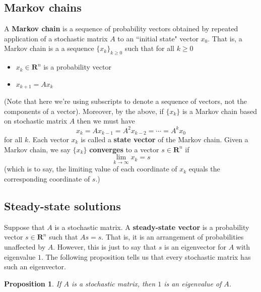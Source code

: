 \documentclass[12pt]{article}
\numberwithin{equation}{subsection}
\numberwithin{figure}{subsection}
\newtheorem{prop}[subsection]{Proposition}
\theoremstyle{note}
\newcommand{\R}{\mathbf{R}}
\begin{document}
\subsection{Markov chains} A \textbf{Markov chain} is a sequence of probability vectors obtained by repeated application of a stochastic matrix $A$ to an ``initial state" vector $x_0$. That is, a Markov chain is a a sequence $\{x_k\}_{k\geq 0}$  such that for all $k\geq 0$
\begin{itemize} \item $x_k\in \R^n$ is a probability vector
\item $  x_{k+1}=Ax_{k}$
\end{itemize}
(Note that here we're using subscripts to denote a sequence of vectors, not the components of a vector). Moreover, by the above, if $\{x_k\}$ is a Markov chain based on stochastic matrix $A$ then we must have \[ x_k=Ax_{k-1}=A^2x_{k-2}=\cdots=A^kx_0\] for all $k$. Each vector $x_k$ is called a \textbf{state vector} of the Markov chain. Given a Markov chain, we say $\{x_k\}$ \textbf{converges} to a vector $s\in \R^n$ if  \begin{equation} \lim_{k\to \infty} x_k=s\end{equation} (which is to say, the limiting value of each coordinate of $x_k$ equals the corresponding coordinate of $s$.)


\subsection{Steady-state solutions}

Suppose that $A$ is a stochastic matrix. A \textbf{steady-state vector} is a probability vector $s\in \R^n$ such that $As=s$. That is, it is an arrangement of probabilities unaffected by $A$. However, this is just to say that $s$ is an eigenvector for $A$ with eigenvalue $1$. The following proposition tells us that every stochastic matrix has such an eigenvector.


\begin{prop} \label{prop-1-eig}
	If $A$ is a stochastic matrix, then $1$ is an eigenvalue of $A$. 
\end{prop}
\end{document}
